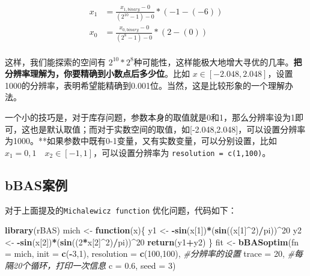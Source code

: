 \documentclass[]{ctexbook}
\newenvironment{Shaded}{\begin{snugshade}}{\end{snugshade}}
\newcommand{\KeywordTok}[1]{\textcolor[rgb]{0.13,0.29,0.53}{\textbf{#1}}}
\newcommand{\DataTypeTok}[1]{\textcolor[rgb]{0.13,0.29,0.53}{#1}}
\newcommand{\DecValTok}[1]{\textcolor[rgb]{0.00,0.00,0.81}{#1}}
\newcommand{\FloatTok}[1]{\textcolor[rgb]{0.00,0.00,0.81}{#1}}
\newcommand{\StringTok}[1]{\textcolor[rgb]{0.31,0.60,0.02}{#1}}
\newcommand{\CommentTok}[1]{\textcolor[rgb]{0.56,0.35,0.01}{\textit{#1}}}
\newcommand{\ControlFlowTok}[1]{\textcolor[rgb]{0.13,0.29,0.53}{\textbf{#1}}}
\newcommand{\OperatorTok}[1]{\textcolor[rgb]{0.81,0.36,0.00}{\textbf{#1}}}
\newcommand{\NormalTok}[1]{#1}
\begin{document}
\[
\begin{aligned}
x_1 &= \frac{x_{1,binary}-0}{(2^{10}-1)-0} * (-1-(-6))\\
x_0 &= \frac{x_{0,binary}-0}{(2^{8}-1)-0} * (2-(0))\\
\end{aligned}
\]

这样，我们能探索的空间有
\(2^{10}*2^8\)种可能性，这样能极大地增大寻优的几率。\textbf{把分辨率理解为，你要精确到小数点后多少位}。比如
\(x\in[-2.048,2.048]\)，设置1000的分辨率，表明希望能精确到0.001位。当然，这是比较形象的一个理解办法。

一个小的技巧是，对于库存问题，参数本身的取值就是0和1，那么分辨率设为1即可，这也是默认取值；而对于实数空间的取值，如{[}-2.048,2.048{]}，可以设置分辨率为1000。**如果参数中既有0-1变量，又有实数变量，可以分别设置，比如
\(x_1 = 0,1 \quad x_2\in[-1,1]\)，可以设置分辨率为
\texttt{resolution\ =\ c(1,100)}。

\subsection{bBAS案例}\label{bBASexamples}

对于上面提及的\texttt{Michalewicz\ function} 优化问题，代码如下：

\begin{Shaded}
\begin{Highlighting}[]
\KeywordTok{library}\NormalTok{(rBAS)}
\NormalTok{mich <-}\StringTok{ }\ControlFlowTok{function}\NormalTok{(x)\{}
\NormalTok{  y1 <-}\StringTok{ }\OperatorTok{-}\KeywordTok{sin}\NormalTok{(x[}\DecValTok{1}\NormalTok{])}\OperatorTok{*}\NormalTok{(}\KeywordTok{sin}\NormalTok{((x[}\DecValTok{1}\NormalTok{]}\OperatorTok{^}\DecValTok{2}\NormalTok{)}\OperatorTok{/}\NormalTok{pi))}\OperatorTok{^}\DecValTok{20}
\NormalTok{  y2 <-}\StringTok{ }\OperatorTok{-}\KeywordTok{sin}\NormalTok{(x[}\DecValTok{2}\NormalTok{])}\OperatorTok{*}\NormalTok{(}\KeywordTok{sin}\NormalTok{((}\DecValTok{2}\OperatorTok{*}\NormalTok{x[}\DecValTok{2}\NormalTok{]}\OperatorTok{^}\DecValTok{2}\NormalTok{)}\OperatorTok{/}\NormalTok{pi))}\OperatorTok{^}\DecValTok{20}
  \KeywordTok{return}\NormalTok{(y1}\OperatorTok{+}\NormalTok{y2)}
\NormalTok{\}}
\NormalTok{fit <-}\StringTok{ }\KeywordTok{bBASoptim}\NormalTok{(}\DataTypeTok{fn =}\NormalTok{ mich,}
                 \DataTypeTok{init =} \KeywordTok{c}\NormalTok{(}\OperatorTok{-}\DecValTok{3}\NormalTok{,}\DecValTok{1}\NormalTok{),}
                 \DataTypeTok{resolution =} \KeywordTok{c}\NormalTok{(}\DecValTok{100}\NormalTok{,}\DecValTok{100}\NormalTok{), }\CommentTok{#分辨率的设置}
                 \DataTypeTok{trace =} \DecValTok{20}\NormalTok{, }\CommentTok{#每隔20个循环，打印一次信息}
                 \DataTypeTok{c =} \FloatTok{0.6}\NormalTok{,}
                 \DataTypeTok{seed =} \DecValTok{3}\NormalTok{)}
\end{Highlighting}
\end{Shaded}
\end{document}
